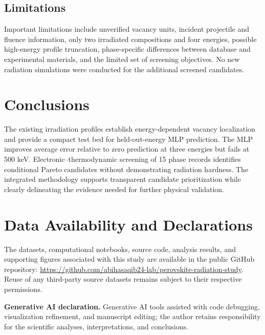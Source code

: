 \documentclass[10pt,letterpaper,twocolumn]{article}
\begin{document}
\subsection{Limitations}
Important limitations include unverified vacancy units, incident projectile and fluence information, only two irradiated compositions and four energies, possible high-energy profile truncation, phase-specific differences between database and experimental materials, and the limited set of screening objectives. No new radiation simulations were conducted for the additional screened candidates.

\section{Conclusions}
The existing irradiation profiles establish energy-dependent vacancy localization and provide a compact test bed for held-out-energy MLP prediction. The MLP improves average error relative to zero prediction at three energies but fails at 500 keV. Electronic--thermodynamic screening of 15 phase records identifies conditional Pareto candidates without demonstrating radiation hardness. The integrated methodology supports transparent candidate prioritization while clearly delineating the evidence needed for further physical validation.

\section*{Data Availability and Declarations}
The datasets, computational notebooks, source code, analysis results, and supporting figures associated with this study are available in the public GitHub repository: \url{https://github.com/abihasaqib24-lab/perovskite-radiation-study}. Reuse of any third-party source datasets remains subject to their respective permissions.

\noindent\textbf{Generative AI declaration.} Generative AI tools assisted with code debugging, visualization refinement, and manuscript editing; the author retains responsibility for the scientific analyses, interpretations, and conclusions.
\end{document}

